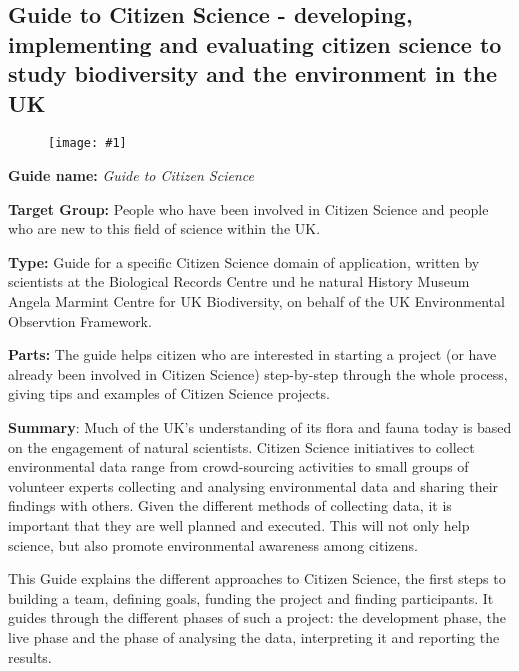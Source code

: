 \documentclass{article}
\newlength{\imgwidth}
\newcommand\scaledgraphics[2]{%
                
\settowidth{\imgwidth}{\texttt{[image: \#1]}}%
                
\setlength{\imgwidth}{\minof{\imgwidth}{#2\textwidth}}%
                
\texttt{[image: \#1]}%
                
}
\begin{document}
\subsection{Guide to Citizen Science - developing, implementing and evaluating citizen science to study biodiversity and the environment in the UK}\label{H3514415}



\begin{center}
\begin{figure}
\scaledgraphics{bfcdb806-4a62-40b9-92f8-a4b78de8ea77.png}{0.75}
\label{F60825051}
\end{figure}


\end{center}


\textbf{Guide name: }\emph{Guide to Citizen Science}\textbf{ } \autocite{tweddle_guide_2012}


\textbf{Target Group: }People who have been involved in Citizen Science and people who are new to this field of science within the UK.


\textbf{Type: }Guide for a specific Citizen Science domain of application, written by scientists at the Biological Records Centre und he natural History Museum Angela Marmint Centre for UK Biodiversity, on behalf of the UK Environmental Observtion Framework.


\textbf{Parts: }The guide helps citizen who are interested in starting a project (or have already been involved in Citizen Science) step-by-step through the whole process, giving tips and examples of Citizen Science projects.


\textbf{Summary}: Much of the UK's understanding of its flora and fauna today is based on the engagement of natural scientists. Citizen Science initiatives to collect environmental data range from crowd-sourcing activities to small groups of volunteer experts collecting and analysing environmental data and sharing their findings with others. Given the different methods of collecting data, it is important that they are well planned and executed. This will not only help science, but also promote environmental awareness among citizens.


This Guide explains the different approaches to Citizen Science, the first steps to building a team, defining goals, funding the project and finding participants. It guides through the different phases of such a project: the development phase, the live phase and the phase of analysing the data, interpreting it and reporting the results.
\end{document}
